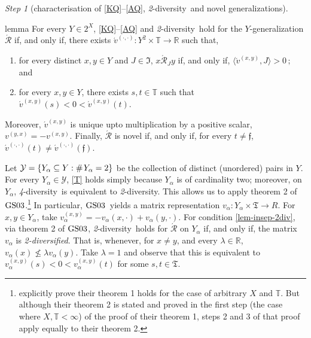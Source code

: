\documentclass[ecta,nameyear,draft]{econsocart}
\newcommand{\countof}{\mathbin{\#}\hskip1pt}
\newcommand{\R}{\mathbb R}
\newcommand{\mc}{\mathcal}
\newcommand{\novel}{\mathfrak f}
\newcommand{\aext}{\mathrel{\acute{\mathrel{\mathcal R}}}}
\newcommand{\mbbt}{{\mathds {T}}}
\newcommand{\mbbtpp}{{\mathfrak{T}}}
\newcommand{\mbbjpp}{\mathfrak{I}}
\newcommand{\xy}{{(x, y)}}
\newcommand{\yx}{{(y, x)}}
\newcommand{\dd}{{(\cdot,\cdot)}}
\newcommand{\twodiv}{\textit{2}-\textup{diversity}}
\newcommand{\fourdiv}{\textit{4}-\textup{diversity}}
\newcommand{\gsii}{$\textup{GS03}$}
\theoremstyle{plain}
\theoremstyle{remark}
\newtheorem{step}{Step}[section]
\begin{document}
\begin{appendix}
\begin{step}[characterisation of \ref{KQ}–\ref{AQ}, \twodiv\ and novel
      generalizations]
    \begin{theoremEnd}{lemma}\label{lem-insep} For every $Y \in 2^{X}$,
      \ref{KQ}--\ref{AQ} and \twodiv\ hold for the $Y$-generalization $\aext$
      if, and only if, there exists $\acute{v}^{\dd}: Y^2 \times \mbbt
      \rightarrow \R$ such that,
      \begin{enumerate}[label=\textup{(\roman*)}]
        \item\label{lem-insep-rep} for every distinct $x, y \in Y$ and $J \in
          \mbbjpp$, $x \aext_J y$ if, and only if, $\langle \acute{v}^{\xy},
          J \rangle > 0$$\,;$ \textup{and}
        \item\label{lem-insep-2div} for every $x, y \in Y$, there exists $s, t
          \in \mbbt$ such that $\acute{v}^{\xy}(s) < 0 < \acute{v}^{\xy}(t)$.
      \end{enumerate}
      Moreover, $\acute{v}^{\xy}$ is unique upto multiplication by a positive
      scalar,  $v^{\yx} = - v^{\xy}$. Finally,  $\aext$ is novel if, and only
      if, for every $t \neq \novel$, $\acute{v}^{\dd}(t) \neq
      \acute{v}^{\dd}(\novel)$.
    \end{theoremEnd}

    \begin{proofEnd}
      Let $\mc Y = \{Y_\alpha \subseteq Y : \countof Y_\alpha = 2\}$ be the
      collection of distinct (unordered) pairs in $Y$. For every $Y_\alpha \in
      \mc Y$, \ref{T} holds simply because $Y_\alpha$ is of cardinality two;
      moreover, on $Y_\alpha$, \fourdiv\ is equivalent to \twodiv. This allows
      us to apply theorem 2 of \gsii.\footnote{\citeauthor{gilboa2003inductive}
        explicitly prove their theorem 1 holds for the case of arbitrary $X$
        and $\mbbt$. But although their theorem 2 is stated and proved in the
        first step (the case where $X, \mbbt < \infty$) of the proof of their
        theorem 1, steps 2 and 3 of that proof apply equally to their theorem
      2.}  In particular, \gsii\ yields a matrix representation $v_\alpha :
      Y_\alpha \times \mbbtpp \rightarrow R$. For $x, y \in Y_\alpha$, take
      $v^{\xy}_{\alpha} = - v_{\alpha}(x, \cdot) + v_{\alpha}(y, \cdot)$. 
      For condition \ref{lem-insep-2div}, via theorem 2 of \gsii, \twodiv\
      holds for $\aext$ on $Y_\alpha$ if, and only if, the matrix $v_\alpha$
      is \emph{2-diversified}. That is, whenever, for $x\neq y$, and every
      $\lambda \in \R$, $v_\alpha (x) \not \leq \lambda v_\alpha(y)$. Take
      $\lambda = 1$ and observe that this is equivalent to
      $v^{\xy}_{\alpha}(s) < 0 < v^{\xy}_{\alpha}(t)$ for some $s, t \in
      \mbbtpp$.
    

\end{proofEnd}
\end{step}
\end{appendix}
\end{document}
